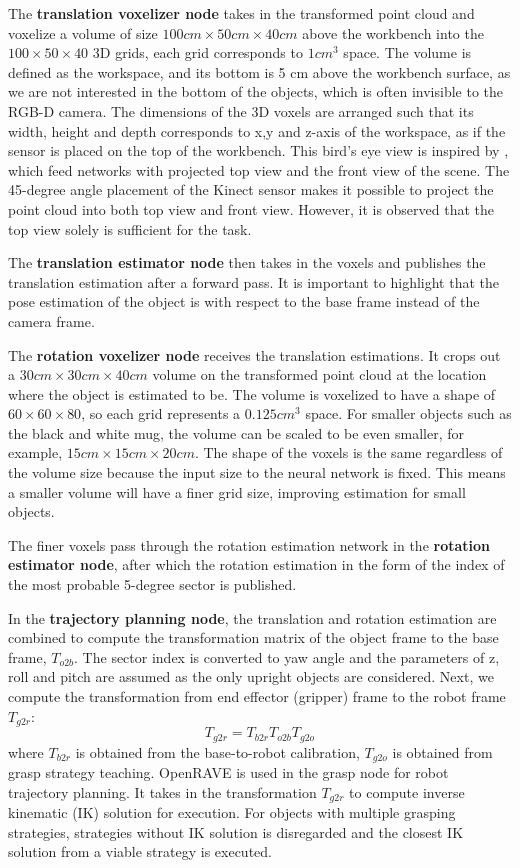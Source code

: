 \documentclass[conference]{IEEEtran}
\begin{document}
The \textbf{translation voxelizer node} takes in the transformed point cloud and voxelize a volume of size $100 cm\times50 cm\times40 cm$ above the workbench into the $100\times50\times40$ 3D grids, each grid corresponds to $1 cm^{3}$ space. The volume is defined as the workspace, and its bottom is 5 cm above the workbench surface, as we are not interested in the bottom of the objects, which is often invisible to the RGB-D camera. The dimensions of the 3D voxels are arranged such that its width, height and depth corresponds to x,y and z-axis of the workspace, as if the sensor is placed on the top of the workbench. This bird's eye view is inspired by \cite{chen_2017_cvpr}, which feed networks with projected top view and the front view of the scene. The 45-degree angle placement of the Kinect sensor makes it possible to project the point cloud into both top view and front view. However, it is observed that the top view solely is sufficient for the task.

The \textbf{translation estimator node} then takes in the voxels and publishes the translation estimation after a forward pass. It is important to highlight that the pose estimation of the object is with respect to the base frame instead of the camera frame.

The \textbf{rotation voxelizer node} receives the translation estimations. It crops out a $30 cm\times30 cm\times40 cm$ volume on the transformed point cloud at the location where the object is estimated to be. The volume is voxelized to have a shape of $60\times60\times80$, so each grid represents a $0.125 cm^{3}$ space. For smaller objects such as the black and white mug, the volume can be scaled to be even smaller, for example, $15 cm\times15 cm\times20 cm$. The shape of the voxels is the same regardless of the volume size because the input size to the neural network is fixed. This means a smaller volume will have a finer grid size, improving estimation for small objects.

The finer voxels pass through the rotation estimation network in the \textbf{rotation estimator node}, after which the rotation estimation in the form of the index of the most probable 5-degree sector is published.

In the \textbf{trajectory planning node}, the translation and rotation estimation are combined to compute the transformation matrix of the object frame to the base frame, $T_{o2b}$. The sector index is converted to yaw angle and the parameters of z, roll and pitch are assumed as the only upright objects are considered. Next, we compute the transformation from end effector (gripper) frame to the robot frame $T_{g2r}$:
$$T_{g2r} = T_{b2r}T_{o2b}T_{g2o}$$
where $T_{b2r}$ is obtained from the base-to-robot calibration, $T_{g2o}$ is obtained from grasp strategy teaching. OpenRAVE is used in the grasp node for robot trajectory planning. It takes in the transformation $T_{g2r}$ to compute inverse kinematic (IK) solution for execution. For objects with multiple grasping strategies, strategies without IK solution is disregarded and the closest IK solution from a viable strategy is executed.
\end{document}
